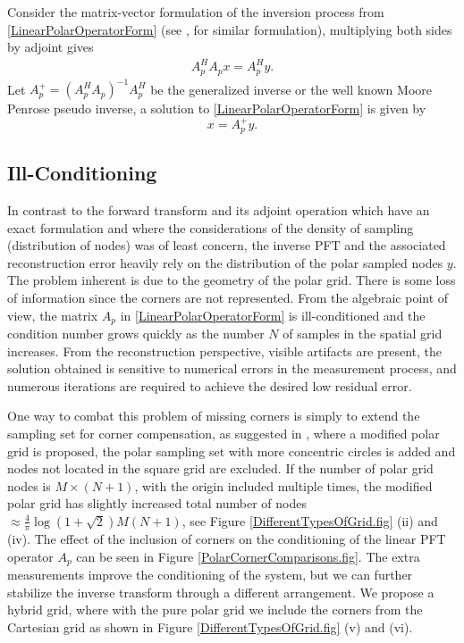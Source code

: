 \documentclass{UCF_ETD}
\begin{document}
 
 Consider the matrix-vector formulation of the inversion process from \eqref{LinearPolarOperatorForm} (see \cite{Amir2001}, \cite{Fessler2003} for similar formulation), multiplying both sides by adjoint gives
 \begin{eqnarray*}
 A^H_p A_p x = A^H_p y.
 \end{eqnarray*}
 Let $A^+_p = (A^H_p A_p)^{-1}A^H_p $  be the generalized inverse or the well known Moore Penrose pseudo inverse, a solution to \eqref{LinearPolarOperatorForm} is given by
 \begin{equation} \label{DirectPseudoInversion}
 x = A^+_p y.
 \end{equation}
 
 
 
 \subsection{Ill-Conditioning}
 
 In contrast to the forward transform and its adjoint operation which have an exact formulation and where the considerations of the density of sampling (distribution of nodes) was of least concern, the inverse PFT and the associated reconstruction error heavily rely on the distribution of the polar sampled nodes $y$. The problem inherent is due to the geometry of the polar grid. There is some loss of information since the corners are not represented. From the algebraic point of view, the matrix $A_p$ in \eqref{LinearPolarOperatorForm} is ill-conditioned and the condition number grows quickly as the number  $N$ of samples in the spatial grid increases. From the reconstruction perspective, visible artifacts are present,  the solution obtained is  sensitive to numerical errors in the measurement process, and  numerous iterations are required to achieve the desired low residual error.
 
 One way to combat this problem of missing corners is simply to extend the sampling set for corner compensation, as suggested in \cite{Markus2007}, where a modified polar grid is proposed, the polar sampling set with more concentric circles is added and  nodes not located in the square grid are excluded. If the number of polar grid nodes is $M\times (N+1)$, with the origin included multiple times, the modified polar grid has slightly increased total number of nodes $\approx \frac{4}{\pi}\log (1+\sqrt{2})M(N+1)$, see Figure \ref{DifferentTypesOfGrid.fig} (ii) and (iv). The effect of the inclusion of corners on the conditioning of the linear PFT operator $A_p$ can be seen in Figure \ref{PolarCornerComparisons.fig}. The extra measurements improve the conditioning of the system, but we can further stabilize the inverse transform through a different arrangement. We propose a hybrid grid, where with the pure polar grid we include the corners from the Cartesian grid as shown in Figure \ref{DifferentTypesOfGrid.fig} (v) and (vi).
 
\end{document}
